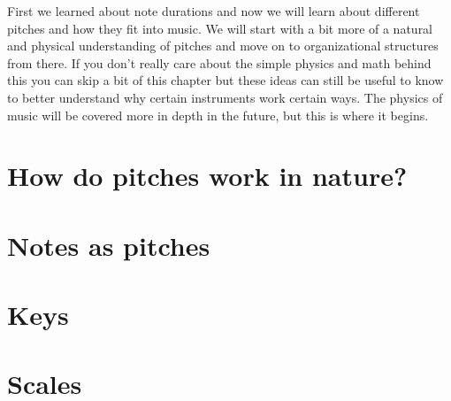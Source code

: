 \documentclass[../OpenAppliedMusicTheory.tex]{subfiles}
\begin{document}
    
    First we learned about note durations and now we will learn about different pitches and how they fit into music. We will start with a bit more of a natural and physical understanding of pitches and move on to organizational structures from there. If you don't really care about the simple physics and math behind this you can skip a bit of this chapter but these ideas can still be useful to know to better understand why certain instruments work certain ways. The physics of music will be covered more in depth in the future, but this is where it begins. %

    \section{How do pitches work in nature?}\label{ch3:pitches-in-nature}

    \section{Notes as pitches}\label{ch3:note-pitches}

    \section{Keys}\label{ch3:keys}

    \section{Scales}\label{ch3:scales}
\end{document}
